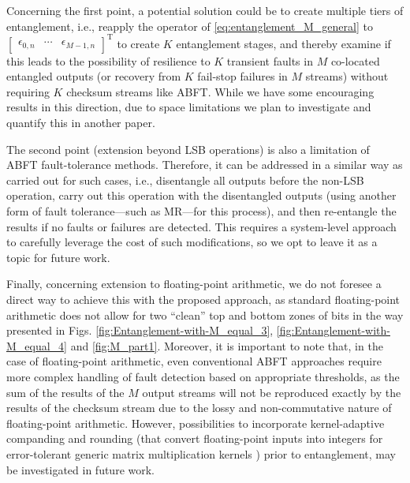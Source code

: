\documentclass[twocolumn,english,onecolumn]{IEEEtran}
\theoremstyle{plain}
\theoremstyle{plain}
\begin{document}
Concerning the first point, a potential solution could be to create
multiple tiers of entanglement, i.e., reapply the operator of \eqref{eq:entanglement_M_general}
to $\begin{bmatrix}\epsilon_{0,n} & \cdots & \epsilon_{M-1,n}\end{bmatrix}^{\text{T}}$
to create $K$ entanglement stages, and thereby examine if this leads
to the possibility of resilience to $K$ transient faults in $M$
co-located entangled outputs (or recovery from $K$ fail-stop failures
in $M$ streams) without requiring $K$ checksum streams like ABFT.
While we have some encouraging results in this direction, due to space
limitations we plan to investigate and quantify this in another paper. 

The second point (extension beyond LSB operations) is also a limitation
of ABFT fault-tolerance methods. Therefore, it can be addressed in
a similar way as carried out for such cases, i.e., disentangle all
outputs before the non-LSB operation, carry out this operation with
the disentangled outputs (using another form of fault tolerance---such
as MR---for this process), and then re-entangle the results if no
faults or failures are detected. This requires a system-level approach
to carefully leverage the cost of such modifications, so we opt to
leave it as a topic for future work. 

Finally, concerning extension to floating-point arithmetic, we do
not foresee a direct way to achieve this with the proposed approach,
as standard floating-point arithmetic does not allow for two ``clean''
top and bottom zones of bits in the way presented in Figs. \ref{fig:Entanglement-with-M_equal_3},
\ref{fig:Entanglement-with-M_equal_4} and \ref{fig:M_part1}. Moreover,
it is important to note that, in the case of floating-point arithmetic,
even conventional ABFT approaches require more complex handling of
fault detection based on appropriate thresholds, as the sum of the
results of the $M$ output streams will not be reproduced exactly
by the results of the checksum stream due to the lossy and non-commutative
nature of floating-point arithmetic. However, possibilities to incorporate
kernel-adaptive companding and rounding (that convert floating-point
inputs into integers for error-tolerant generic matrix multiplication
kernels \cite{anastasia2012throughput}) prior to entanglement, may
be investigated in future work. 
\end{document}
